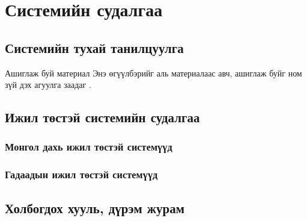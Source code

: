 \chapter{Системийн судалгаа}
\label{chapter1}
\section{Системийн тухай танилцуулга}

Ашиглаж буй материал \cite{internetusers} Энэ өгүүлбэрийг аль материалаас авч, ашиглаж буйг \cite{Reference1} ном зүй дэх агуулга заадаг \cite{ios}.

\section{Ижил төстэй системийн судалгаа}
\subsection{Монгол дахь ижил төстэй системүүд}
\subsection{Гадаадын ижил төстэй системүүд}

\section{Холбогдох хууль, дүрэм журам}

